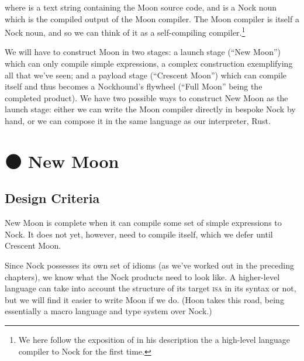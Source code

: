 \noindent
where  is a text string containing the Moon source code, and  is a Nock noun which is the compiled output of the Moon compiler.  The Moon compiler is itself a Nock noun, and so we can think of it as a self-compiling compiler.\footnote{We here follow the exposition of \citet{Yarvin2010c} in his description the a high-level language compiler to Nock for the first time.}


We will have to construct Moon in two stages:  a launch stage (``New Moon'') which can only compile simple expressions, a complex construction exemplifying all that we've seen; and a payload stage (``Crescent Moon'') which can compile itself and thus becomes a Nockhound's flywheel (``Full Moon'' being the completed product).  We have two possible ways to construct New Moon as the launch stage:  either we can write the Moon compiler directly in bespoke Nock by hand, or we can compose it in the same language as our interpreter, Rust.

\section{\textrm{🌑} New Moon}

\subsection{Design Criteria}

New Moon is complete when it can compile some set of simple expressions to Nock.  It does not yet, however, need to compile itself, which we defer until Crescent Moon.

Since Nock possesses its own set of idioms (as we've worked out in the preceding chapters), we know what the Nock products need to look like.  A higher-level language can take into account the structure of its target \textsc{isa} in its syntax or not, but we will find it easier to write Moon if we do.  (Hoon takes this road, being essentially a macro language and type system over Nock.)

